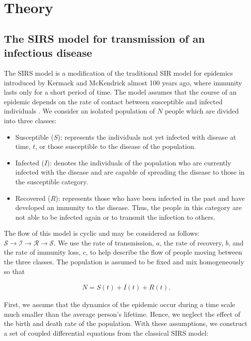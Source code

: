 \documentclass[../main.tex]{subfiles}
\begin{document}
\section{Theory}\label{sec:theory}
\subsection{The SIRS model for transmission of an infectious disease}
The SIRS model is a modification of the traditional SIR model for epidemics introduced by Kermack and McKendrick \cite{SIRmodel} almost 100 years ago, where immunity lasts only for a short period of time. The model assumes that the course of an epidemic depends on the rate of contact between susceptible and infected individuals \cite{José}. We consider an isolated population of $N$ people which are divided into three classes: 

\begin{itemize}
    \item Susceptible ($S$): represents the individuals not yet infected with disease at time, $t$, or those susceptible to the disease of the population. 
    \item Infected ($I$): denotes the individuals of the population who are currently infected with the disease and are capable of spreading the disease to those in the susceptible category. 
    \item Recovered ($R$): represents those who have been infected in the past and have developed an immunity to the disease. Thus, the people in this category are not able to be infected again or to transmit the infection to others. 
\end{itemize}

The flow of this model is cyclic and may be considered as follows: 
\ensuremath{\mathcal{S}\rightarrow\mathcal{I}\rightarrow\mathcal{R}\rightarrow\mathcal{S}}. We use the rate of transmission, $a$, the rate of recovery, $b$, and the rate of immunity loss, $c$, to help describe the flow of people moving between the three classes. The population is assumed to be fixed and mix homogeneously so that

\begin{align}
    N=S(t)+I(t)+R(t).
    \label{eq:N}
\end{align}

First, we assume that the dynamics of the epidemic occur during a time scale much smaller than the average person's lifetime. Hence, we neglect the effect of the birth and death rate of the population. With these assumptions, we construct a set of coupled differential equations from the classical SIRS model:  
\end{document}
